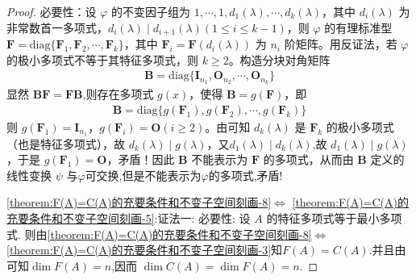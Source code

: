 \documentclass[../../main.tex]{subfiles}%
\begin{document}
\begin{proof}
{\heiti 必要性：}设 $\varphi$ 的不变因子组为 $1,\cdots,1,d_1(\lambda),\cdots,d_k(\lambda)$，其中 $d_i(\lambda)$ 为非常数首一多项式，$d_i(\lambda)\mid d_{i + 1}(\lambda) (1\leqslant  i\leqslant  k - 1)$，则 $\varphi$ 的有理标准型 $\boldsymbol{F}=\mathrm{diag}\{\boldsymbol{F}_1,\boldsymbol{F}_2,\cdots,\boldsymbol{F}_k\}$，其中 $\boldsymbol{F}_i = \boldsymbol{F}(d_i(\lambda))$ 为 $n_i$ 阶矩阵。用反证法，若 $\varphi$ 的极小多项式不等于其特征多项式，则 $k\geqslant  2$。构造分块对角矩阵
\begin{align*}
\boldsymbol{B}=\mathrm{diag}\{\boldsymbol{I}_{n_1},\boldsymbol{O}_{n_2},\cdots,\boldsymbol{O}_{n_k}\}
\end{align*}
显然 $\boldsymbol{BF}=\boldsymbol{FB}$,则存在多项式 $g(x)$，使得 $\boldsymbol{B}=g(\boldsymbol{F})$，即
\begin{align*}
\boldsymbol{B}=\mathrm{diag}\{g(\boldsymbol{F}_1),g(\boldsymbol{F}_2),\cdots,g(\boldsymbol{F}_k)\}
\end{align*}
则 $g(\boldsymbol{F}_1)=\boldsymbol{I}_{n_1}$，$g(\boldsymbol{F}_i)=\boldsymbol{O}(i\geqslant  2)$。由可知 $d_k(\lambda)$ 是 $\boldsymbol{F}_k$ 的极小多项式（也是特征多项式），故 $d_k(\lambda)\mid g(\lambda)$，又$d_1(\lambda)\mid d_k(\lambda)$,故 $d_1(\lambda)\mid g(\lambda)$，于是 $g(\boldsymbol{F}_1)=\boldsymbol{O}$，矛盾！因此 $\boldsymbol{B}$ 不能表示为 $\boldsymbol{F}$ 的多项式，从而由 $\boldsymbol{B}$ 定义的线性变换 $\psi$ 与$\varphi$可交换,但是不能表示为$\varphi$的多项式,矛盾!

\noindent\ref{theorem:F(A)=C(A)的充要条件和不变子空间刻画-8}$\Leftrightarrow$ \ref{theorem:F(A)=C(A)的充要条件和不变子空间刻画-5}:{\color{blue}证法一:}
{\heiti 必要性:} 设 $A$ 的特征多项式等于最小多项式. 则由\ref{theorem:F(A)=C(A)的充要条件和不变子空间刻画-8}$\Leftrightarrow$ \ref{theorem:F(A)=C(A)的充要条件和不变子空间刻画-3}知$F(A) = C(A)$.并且由可知$\dim F(A) = n$,因而 $\dim C(A) = \dim F(A) = n$.


\end{proof}
\end{document}
